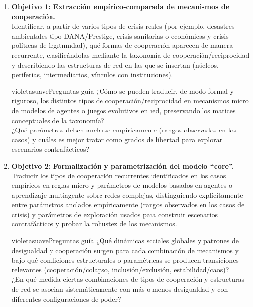 \documentclass[a4paper,11pt]{article}
\begin{document}
\begin{seccionbox}[verdesuave]
\begin{enumerate}
    \item \textbf{Objetivo 1: Extracción empírico‑comparada de mecanismos de cooperación.}\\[0.2cm]
    Identificar, a partir de varios tipos de crisis reales (por ejemplo, desastres ambientales tipo DANA/Prestige, crisis sanitarias o económicas y crisis políticas de legitimidad), qué formas de cooperación aparecen de manera recurrente, clasificándolas mediante la taxonomía de cooperación/reciprocidad y describiendo las estructuras de red en las que se insertan (núcleos, periferias, intermediarios, vínculos con instituciones).

\tcbline

    \begin{caja}{violetasuave}{Preguntas guía}{}
        ¿Cómo se pueden traducir, de modo formal y riguroso, los distintos tipos de cooperación/reciprocidad en mecanismos micro de modelos de agentes o juegos evolutivos en red, preservando los matices conceptuales de la taxonomía?\\[0.2cm]
        ¿Qué parámetros deben anclarse empíricamente (rangos observados en los casos) y cuáles es mejor tratar como grados de libertad para explorar escenarios contrafácticos?
    \end{caja}

    \item \textbf{Objetivo 2: Formalización y parametrización del modelo “core”.}\\[0.2cm]
    Traducir los tipos de cooperación recurrentes identificados en los casos empíricos en reglas micro y parámetros de modelos basados en agentes o aprendizaje multiagente sobre redes complejas, distinguiendo explícitamente entre parámetros anclados empíricamente (rangos observados en los casos de crisis) y parámetros de exploración usados para construir escenarios contrafácticos y probar la robustez de los mecanismos.

\tcbline

    \begin{caja}{violetasuave}{Preguntas guía}{}
        ¿Qué dinámicas sociales globales y patrones de desigualdad y cooperación surgen para cada combinación de mecanismos y bajo qué condiciones estructurales o paramétricas se producen transiciones relevantes (cooperación/colapso, inclusión/exclusión, estabilidad/caos)?\\[0.2cm]
        ¿En qué medida ciertas combinaciones de tipos de cooperación y estructuras de red se asocian sistemáticamente con más o menos desigualdad y con diferentes configuraciones de poder?
    \end{caja}


\end{enumerate}
\end{seccionbox}
\end{document}
